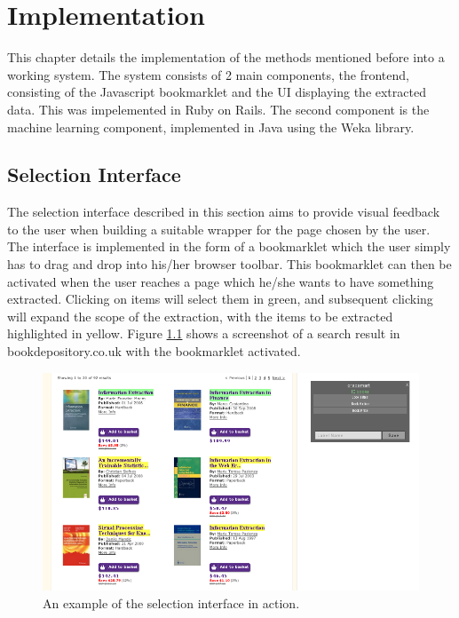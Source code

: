
\chapter{Implementation}

This chapter details the implementation of the methods mentioned before into a working system. The system consists of 2 main components, the frontend, consisting of the Javascript bookmarklet and the UI displaying the extracted data. This was impelemented in Ruby on Rails. The second component is the machine learning component, implemented in Java using the Weka library.


\section{Selection Interface}
\label{chap:selection}

The selection interface described in this section aims to provide visual feedback to the user when building a suitable wrapper for the page chosen by the user. The interface is implemented in the form of a bookmarklet which the user simply has to drag and drop into his/her browser toolbar. This bookmarklet can then be activated when the user reaches a page which he/she wants to have something extracted. Clicking on items will select them in green, and subsequent clicking will expand the scope of the extraction, with the items to be extracted highlighted in yellow. Figure \ref{fig:selection_example} shows a screenshot of a search result in bookdepository.co.uk with the bookmarklet activated.

\begin{figure}[htbp]
\centering
\includegraphics[scale=0.43]{selection_example.png} 
\caption{An example of the selection interface in action.}
\label{fig:selection_example}
\end{figure}

